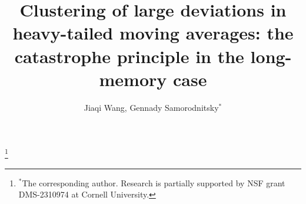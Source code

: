 \documentclass[11pt,reqno]{amsart}
\numberwithin{equation}{section}
\theoremstyle{definition}
\theoremstyle{remark}
\theoremstyle{definition}
\begin{document}
\title[Clustering of large deviations]{Clustering of large deviations in heavy-tailed moving averages:
  the catastrophe principle in the long-memory case}
\author{Jiaqi Wang, Gennady Samorodnitsky$^*$ }
\address{School of Operations Research and Information Engineering\\
Cornell University}

\toggletrue{answers}

\thanks{ $^*$The corresponding author. Research is partially
  supported by NSF grant DMS-2310974 at Cornell University.}










    

\end{document}
